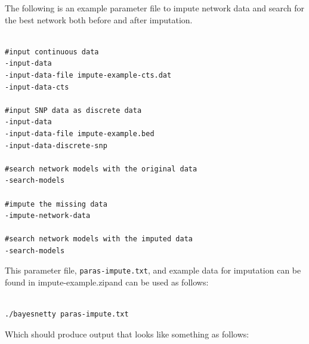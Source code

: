 \documentclass[a4paper,12pt]{article}
\newcommand{\code}[1]{{\footnotesize{{\tt #1}}}}
\begin{document}
The following is an example parameter file to impute network data and search for the best network both before and after imputation. 
\vspace{0.35cm} \begin{lstlisting}

#input continuous data
-input-data
-input-data-file impute-example-cts.dat
-input-data-cts

#input SNP data as discrete data
-input-data
-input-data-file impute-example.bed
-input-data-discrete-snp

#search network models with the original data
-search-models

#impute the missing data
-impute-network-data

#search network models with the imputed data
-search-models

\end{lstlisting} \vspace{0.35cm}
This parameter file, \code{paras-impute.txt}, and example data for imputation can be found in impute-example.zipand can be used as follows: 
\vspace{0.35cm} \begin{lstlisting}

./bayesnetty paras-impute.txt

\end{lstlisting} \vspace{0.35cm}
Which should produce output that looks like something as follows: 
\end{document}
